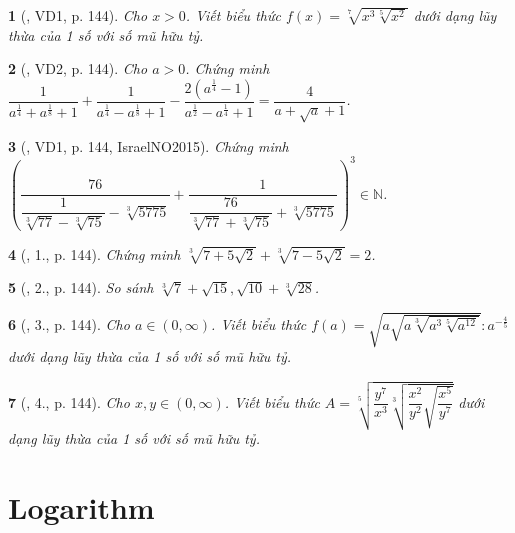 \documentclass{article}
\newtheorem{baitoan}{}
\begin{document}
\begin{baitoan}[\cite{BTNC_Toan_11_DSGTXSTK}, VD1, p. 144]
	Cho $x > 0$. Viết biểu thức $f(x) = \sqrt[7]{x^3\sqrt[5]{x^2}}$ dưới dạng lũy thừa của 1 số với số mũ hữu tỷ.
\end{baitoan}

\begin{baitoan}[\cite{BTNC_Toan_11_DSGTXSTK}, VD2, p. 144]
	Cho $a > 0$. Chứng minh $\dfrac{1}{a^{\frac{1}{4}} + a^{\frac{1}{8}} + 1} + \dfrac{1}{a^{\frac{1}{4}} - a^{\frac{1}{8}} + 1} - \dfrac{2\left(a^{\frac{1}{4}} - 1\right)}{a^{\frac{1}{2}} - a^{\frac{1}{4}} + 1} = \dfrac{4}{a + \sqrt{a} + 1}$.
\end{baitoan}

\begin{baitoan}[\cite{BTNC_Toan_11_DSGTXSTK}, VD1, p. 144, IsraelNO2015]
	Chứng minh $\left(\dfrac{76}{\dfrac{1}{\sqrt[3]{77} - \sqrt[3]{75}} - \sqrt[3]{5775}} + \dfrac{1}{\dfrac{76}{\sqrt[3]{77} + \sqrt[3]{75}} + \sqrt[3]{5775}}\right)^3\in\mathbb{N}$.
\end{baitoan}

\begin{baitoan}[\cite{BTNC_Toan_11_DSGTXSTK}, 1., p. 144]
	Chứng minh $\sqrt[3]{7 + 5\sqrt{2}} + \sqrt[3]{7 - 5\sqrt{2}} = 2$.
\end{baitoan}

\begin{baitoan}[\cite{BTNC_Toan_11_DSGTXSTK}, 2., p. 144]
	So sánh $\sqrt[3]{7} + \sqrt{15},\sqrt{10} + \sqrt[3]{28}$.
\end{baitoan}

\begin{baitoan}[\cite{BTNC_Toan_11_DSGTXSTK}, 3., p. 144]
	Cho $a\in(0,\infty)$. Viết biểu thức $f(a) = \sqrt{a\sqrt{a\sqrt[3]{a^3\sqrt[5]{a^{12}}}}}:a^{-\frac{4}{5}}$ dưới dạng lũy thừa của 1 số với số mũ hữu tỷ.
\end{baitoan}

\begin{baitoan}[\cite{BTNC_Toan_11_DSGTXSTK}, 4., p. 144]
	Cho $x,y\in(0,\infty)$. Viết biểu thức $A = \sqrt[5]{\dfrac{y^7}{x^3}\sqrt[3]{\dfrac{x^2}{y^2}\sqrt{\dfrac{x^5}{y^7}}}}$ dưới dạng lũy thừa của 1 số với số mũ hữu tỷ.
\end{baitoan}


\section{Logarithm}
\end{document}
